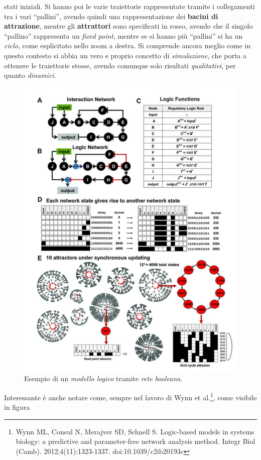 \documentclass[a4paper,12pt, oneside]{book}
\begin{document}
stati iniziali. Si hanno poi le varie traiettorie rappresentate tramite i
collegamenti tra i vari ``pallini'', avendo quindi una rappresentazione dei
\textbf{bacini di attrazione}, mentre gli \textbf{attrattori} sono specificati
in rosso, avendo che il singolo ``pallino'' rappresenta un \textit{fixed point},
mentre se si hanno più ``pallini'' si ha un \textit{ciclo}, come esplicitato
nello zoom a destra. Si comprende ancora meglio come in questo contesto si abbia
un vero e proprio concetto di \textit{simulazione}, che porta a ottenere le
traiettorie stesse, avendo comunque solo risultati \textit{qualitativi}, per
quanto \textit{dinamici}.  \\
\begin{figure}
  \centering
  \includegraphics[scale = 0.35]{img/exbool.jpg}
  \caption{Esempio di un \textit{modello logico} tramite \textit{rete
      booleana}.} 
  \label{fig:exbool}
\end{figure}
Interessante è anche notare come, sempre nel lavoro di Wynn et al.\footnote{Wynn
  ML, Consul N, Merajver SD, Schnell S. Logic-based models in 
  systems biology: a predictive and parameter-free network analysis
  method. Integr Biol
  (Camb). 2012;4(11):1323-1337. doi:10.1039/c2ib20193c}, come visibile in figura
\end{document}
